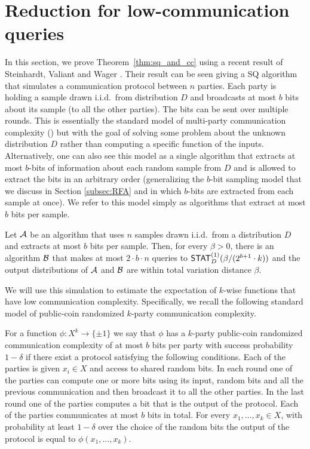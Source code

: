 \section{Reduction for low-communication queries}\label{sec:sq_cc}
In this section, we prove  Theorem~\ref{thm:sq_and_cc} using a recent result of Steinhardt, Valiant and Wager \cite{SteinhardtVW16}.
Their result can be seen giving a SQ algorithm that simulates a communication protocol between $n$ parties. Each party is holding a sample drawn i.i.d.~from distribution $D$ and broadcasts at most $b$ bits about its sample (to all the other parties). The bits can be sent over multiple rounds. This is essentially the standard model of multi-party communication complexity (\eg \cite{KN97}) but with the goal of solving some problem about the unknown distribution $D$ rather than computing a specific function of the inputs. Alternatively, one can also see this model as a single algorithm that extracts at most $b$-bits of information about each random sample from $D$ and is allowed to extract the bits in an arbitrary order (generalizing the $b$-bit sampling model that we discuss in Section \ref{subsec:RFA} and in which $b$-bits are extracted from each sample at once). We refer to this model simply as algorithms that extract at most $b$ bits per sample.

\begin{theorem}\label{thm:SVW}
Let $\mathcal{A}$ be an algorithm that uses $n$ samples drawn i.i.d.~from a distribution $D$ and extracts at most $b$ bits per sample. Then, for every $\beta > 0$, there is an algorithm $\mathcal{B}$ that makes at most $2 \cdot b \cdot n$ queries to $\mathsf{STAT}^{(1)}_D(\beta/(2^{b+1} \cdot k))$ and the output distributions of $\mathcal{A}$ and $\mathcal{B}$ are within total variation distance $\beta$.
\end{theorem}

We will use this simulation to estimate the expectation of $k$-wise functions that have low communication complexity.
Specifically, we recall the following standard model of public-coin randomized $k$-party communication complexity.
\begin{defn}
For a function $\phi:X^k \to \{\pm 1\}$ we say that $\phi$ has a $k$-party public-coin randomized communication complexity of at most $b$ bits per party with success probability $1-\delta$ if there exist a protocol satisfying the following conditions. Each of the parties is given $x_i \in X$ and access to shared random bits. In each round one of the parties can compute one or more bits using its input, random bits and all the previous communication and then broadcast it to all the other parties. In the last round one of the parties computes a bit that is the output of the protocol. Each of the parties communicates at most $b$ bits in total. For every $x_1,\ldots,x_k\in X$, with probability at least $1-\delta$ over the choice of the random bits the output of the protocol is equal to $\phi(x_1,\ldots,x_k)$.
\end{defn}

